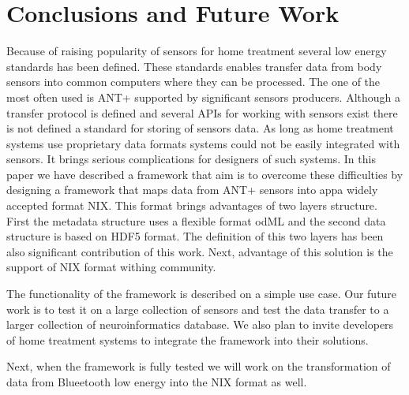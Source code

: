 \documentclass[conference]{IEEEtran}
\begin{document}
\section{Conclusions and Future Work}\label{sec:future-work}

Because of raising popularity of sensors for home treatment several low energy standards has been defined. These standards enables transfer data from body sensors into common computers where they can be processed. The one of the most often used is ANT+ supported by significant sensors producers. Although a transfer protocol is defined and several APIs for working with sensors exist there is not defined a standard for storing of sensors data. As long as home treatment systems use proprietary data formats systems could not be easily integrated with sensors. It brings serious complications for designers of such systems. In this paper we have described a framework that aim is to overcome these difficulties by designing a framework that maps data from ANT+ sensors into appa widely accepted format NIX. This format brings advantages of two layers structure. First the metadata structure uses a flexible format odML and the second data structure is based on HDF5 format. The definition of this two layers has been also significant contribution of this work. Next, advantage of this solution is the support of NIX format withing community.

The functionality of the framework is described on a simple use case. Our future work is to test it on a large collection of sensors and test the data transfer to a larger collection of neuroinformatics database. We also plan to invite developers of home treatment systems to integrate the framework into their solutions. 

Next, when the framework is fully tested we will work on the transformation of data from Blueetooth low energy into the NIX format as well. 






\end{document}
